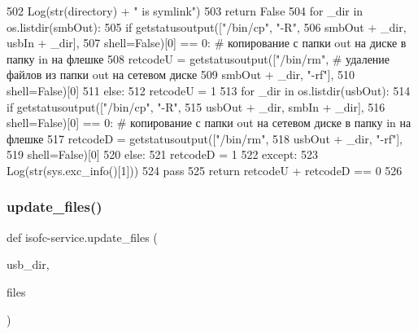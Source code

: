 \begin{DoxyCode}
502                 Log(str(directory) + \textcolor{stringliteral}{" is symlink"})
503                 \textcolor{keywordflow}{return} \textcolor{keyword}{False}
504         \textcolor{keywordflow}{for} \_dir \textcolor{keywordflow}{in} os.listdir(smbOut):
505             \textcolor{keywordflow}{if} getstatusoutput([\textcolor{stringliteral}{"/bin/cp"}, \textcolor{stringliteral}{"-R"},
506                                 smbOut + \_dir, usbIn + \_dir],
507                                shell=\textcolor{keyword}{False})[0] == 0: \textcolor{comment}{# копирование с папки out на диске в папку in на
       флешке}
508                 retcodeU = getstatusoutput([\textcolor{stringliteral}{"/bin/rm"}, \textcolor{comment}{# удаление файлов из папки out на сетевом диске}
509                                             smbOut + \_dir, \textcolor{stringliteral}{"-rf"}],
510                                            shell=\textcolor{keyword}{False})[0]
511             \textcolor{keywordflow}{else}:
512                 retcodeU = 1
513         \textcolor{keywordflow}{for} \_dir \textcolor{keywordflow}{in} os.listdir(usbOut):
514             \textcolor{keywordflow}{if} getstatusoutput([\textcolor{stringliteral}{"/bin/cp"}, \textcolor{stringliteral}{"-R"},
515                                 usbOut + \_dir, smbIn + \_dir],
516                                shell=\textcolor{keyword}{False})[0] == 0:  \textcolor{comment}{# копирование с папки out на сетевом диске в папку in
       на флешке}
517                 retcodeD = getstatusoutput([\textcolor{stringliteral}{"/bin/rm"},
518                                             usbOut + \_dir, \textcolor{stringliteral}{"-rf"}],
519                                            shell=\textcolor{keyword}{False})[0]
520             \textcolor{keywordflow}{else}:
521                 retcodeD = 1
522     \textcolor{keywordflow}{except}:
523         Log(str(sys.exc\_info()[1]))
524         \textcolor{keywordflow}{pass}
525     \textcolor{keywordflow}{return} retcodeU + retcodeD == 0
526 
\end{DoxyCode}
\mbox{\label{isofc-service_8py_file_a50b9ec7706ed7d16a1a8a40d544e86da}} 
\subsubsection{\texorpdfstring{update\+\_\+files()}{update\_files()}}
{\footnotesize\ttfamily def isofc-\/service.\+update\+\_\+files (\begin{DoxyParamCaption}\item[{}]{usb\+\_\+dir,  }\item[{}]{files }\end{DoxyParamCaption})}



